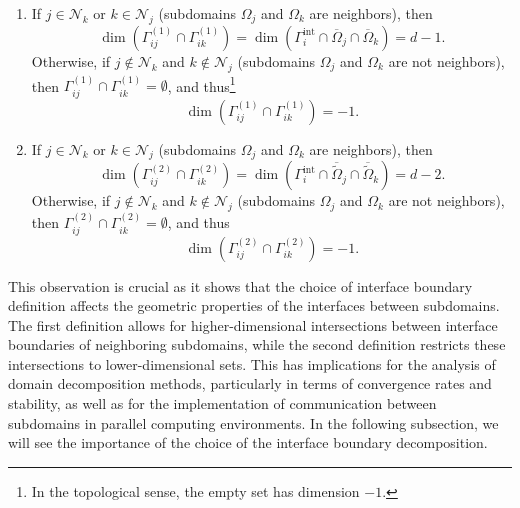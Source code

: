 \documentclass[a4paper, 11pt]{article}
\theoremstyle{remark}
\begin{document}
\begin{enumerate}[label = (\arabic*)]
    \item If $j\in \mathcal{N}_{k}$ or $k \in \mathcal{N}_{j}$ (subdomains $\Omega_j$ and $\Omega_k$ are neighbors), then
    \begin{equation*}
        \dim\left(\Gamma_{ij}^{(1)} \cap \Gamma_{ik}^{(1)}\right) = \dim\left(\Gamma_{i}^{\text{int}} \cap \overline{\Omega}_j \cap \overline{\Omega}_k\right) = d-1.
    \end{equation*}
    Otherwise, if $j \notin \mathcal{N}_{k}$ and $k \notin \mathcal{N}_{j}$ (subdomains $\Omega_j$ and $\Omega_k$ are not neighbors), then $\Gamma_{ij}^{(1)} \cap \Gamma_{ik}^{(1)} = \emptyset$, and thus\footnote{In the topological sense, the empty set has dimension $-1$.}
    \begin{equation*}
        \dim\left(\Gamma_{ij}^{(1)} \cap \Gamma_{ik}^{(1)}\right) = -1.
    \end{equation*}
    \item If $j\in \mathcal{N}_{k}$ or $k \in \mathcal{N}_{j}$ (subdomains $\Omega_j$ and $\Omega_k$ are neighbors), then
    \begin{equation*}
        \dim\left(\Gamma_{ij}^{(2)} \cap \Gamma_{ik}^{(2)}\right) = \dim\left(\Gamma_{i}^{\text{int}} \cap \overline{\widetilde{\Omega}}_j \cap \overline{\widetilde{\Omega}}_k\right) = d-2.
    \end{equation*}
    Otherwise, if $j \notin \mathcal{N}_{k}$ and $k \notin \mathcal{N}_{j}$ (subdomains $\Omega_j$ and $\Omega_k$ are not neighbors), then $\Gamma_{ij}^{(2)} \cap \Gamma_{ik}^{(2)} = \emptyset$, and thus
    \begin{equation*}
        \dim\left(\Gamma_{ij}^{(2)} \cap \Gamma_{ik}^{(2)}\right) = -1.
    \end{equation*}
\end{enumerate}
This observation is crucial as it shows that the choice of interface boundary definition affects the geometric properties of the interfaces between subdomains. 
The first definition allows for higher-dimensional intersections between interface boundaries of neighboring subdomains, while the second definition restricts 
these intersections to lower-dimensional sets. This has implications for the analysis of domain decomposition methods, particularly in terms of convergence rates 
and stability, as well as for the implementation of communication between subdomains in parallel computing environments. In the following subsection, we will see
the importance of the choice of the interface boundary decomposition.
\end{document}
